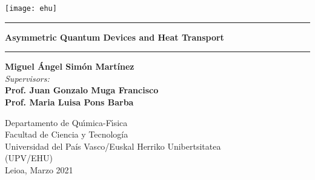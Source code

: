 \begin{titlepage}
\thispagestyle{empty} %
\hspace{-0.3cm}\texttt{[image: ehu]}\hspace{0.3cm}
\bigskip
{\centering \large
\par \vspace{1cm}

\hrule\vspace*{0.5cm}

{\LARGE \bf {Asymmetric Quantum Devices and Heat Transport}}

\vspace{0.7cm}\hrule \vspace{2.75cm}
{\LARGE \bf{Miguel \'{A}ngel Sim\'{o}n Mart\'{i}nez}}\\
\vspace{1.25cm}
{\it{Supervisors:}} \\
\vspace{0.1cm}
{\large \bf {Prof. Juan Gonzalo Muga Francisco}}\\
{\large \bf {Prof. Maria Luisa Pons Barba}}\\
\vspace{2.2cm}
\begin{figure}[h]
{\centering {

}\par}
\end{figure}
\vspace{1.0cm}
Departamento de Qu\'{\i}mica-F\'{\i}sica\\
Facultad de Ciencia y Tecnolog\'ia\\
Universidad del Pa\'is Vasco/Euskal Herriko Unibertsitatea\\ (UPV/EHU)\\
\vspace*{1.0cm}
\hspace{5.5cm}Leioa, Marzo 2021} \pagebreak
\end{titlepage}
